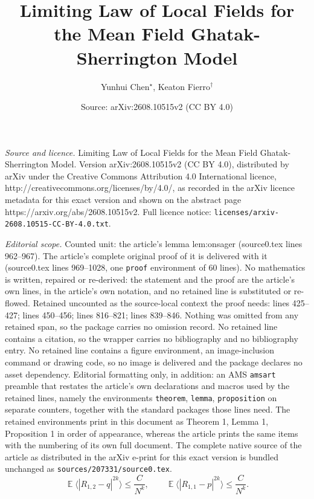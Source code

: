 \documentclass[10pt,a4paper]{amsart}
\title{Limiting Law of Local Fields for the Mean Field Ghatak-Sherrington Model}
\author{Yunhui Chen$^\star$, Keaton Fierro$^\dagger$}
\date{Source: arXiv:2608.10515v2 (CC BY 4.0)}
\DeclareMathOperator{\E}{\mathds{E}}
\renewcommand{\le}{\leqslant}
\begin{document}
\maketitle

\noindent\emph{Source and licence.} Limiting Law of Local Fields for the Mean Field Ghatak-Sherrington Model. Version arXiv:2608.10515v2 (CC BY 4.0), distributed by arXiv under the Creative Commons Attribution 4.0 International licence, http://creativecommons.org/licenses/by/4.0/, as recorded in the arXiv licence metadata for this exact version and shown on the abstract page https://arxiv.org/abs/2608.10515v2. Full licence notice: \texttt{licenses/arxiv-2608.10515-CC-BY-4.0.txt}.\par\smallskip

\noindent\textit{Editorial scope.} Counted unit: the article's lemma lem:onsager (source0.tex lines 962--967). The article's complete original proof of it is delivered with it (source0.tex lines 969--1028, one \texttt{proof} environment of 60 lines). No mathematics is written, repaired or re-derived: the statement and the proof are the article's own lines, in the article's own notation, and no retained line is substituted or re-flowed.  Retained uncounted as the source-local context the proof needs: lines 425--427; lines 450--456; lines 816--821; lines 839--846.  Nothing was omitted from any retained span, so the package carries no omission record.  No retained line contains a citation, so the wrapper carries no bibliography and no bibliography entry.  No retained line contains a figure environment, an image-inclusion command or drawing code, so no image is delivered and the package declares no asset dependency.  Editorial formatting only, in addition: an AMS \texttt{amsart} preamble that restates the article's own declarations and macros used by the retained lines, namely the environments \texttt{theorem}, \texttt{lemma}, \texttt{proposition} on separate counters, together with the standard packages those lines need.  The retained environments print in this document as Theorem 1, Lemma 1, Proposition 1 in order of appearance, whereas the article prints the same items with the numbering of its own full document.  The complete native source of the article as distributed in the arXiv e-print for this exact version is bundled unchanged as \texttt{sources/207331/source0.tex}.
\begin{equation}\label{eq:known-overlap-estimate}
  \E\langle |R_{1,2}-q|^{2k}\rangle \le \frac{C}{N^k}, \qquad \E\langle |R_{1,1}-p|^{2k}\rangle\le \frac{C}{N^k}.
\end{equation}
\end{document}
